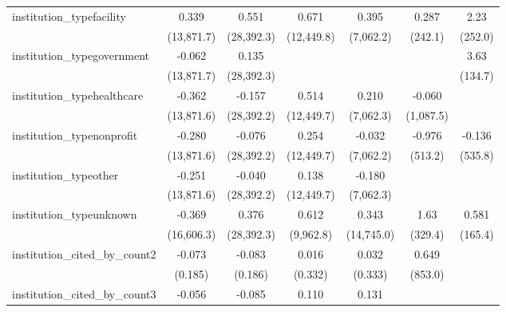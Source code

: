 \begin{tabular}{lcccccc}
   institution\_typefacility             & 0.339         & 0.551          & 0.671         & 0.395         & 0.287          & 2.23\\   
                                         & (13,871.7)    & (28,392.3)     & (12,449.8)    & (7,062.2)     & (242.1)        & (252.0)\\   
   institution\_typegovernment           & -0.062        & 0.135          &               &               &                & 3.63\\   
                                         & (13,871.7)    & (28,392.3)     &               &               &                & (134.7)\\   
   institution\_typehealthcare           & -0.362        & -0.157         & 0.514         & 0.210         & -0.060         &   \\   
                                         & (13,871.6)    & (28,392.2)     & (12,449.7)    & (7,062.3)     & (1,087.5)      &   \\   
   institution\_typenonprofit            & -0.280        & -0.076         & 0.254         & -0.032        & -0.976         & -0.136\\   
                                         & (13,871.6)    & (28,392.2)     & (12,449.7)    & (7,062.2)     & (513.2)        & (535.8)\\   
   institution\_typeother                & -0.251        & -0.040         & 0.138         & -0.180        &                &   \\   
                                         & (13,871.6)    & (28,392.2)     & (12,449.7)    & (7,062.3)     &                &   \\   
   institution\_typeunknown              & -0.369        & 0.376          & 0.612         & 0.343         & 1.63           & 0.581\\   
                                         & (16,606.3)    & (28,392.3)     & (9,962.8)     & (14,745.0)    & (329.4)        & (165.4)\\   
   institution\_cited\_by\_count2        & -0.073        & -0.083         & 0.016         & 0.032         & 0.649          &   \\   
                                         & (0.185)       & (0.186)        & (0.332)       & (0.333)       & (853.0)        &   \\   
   institution\_cited\_by\_count3        & -0.056        & -0.085         & 0.110         & 0.131         &                &   \\   

\end{tabular}
